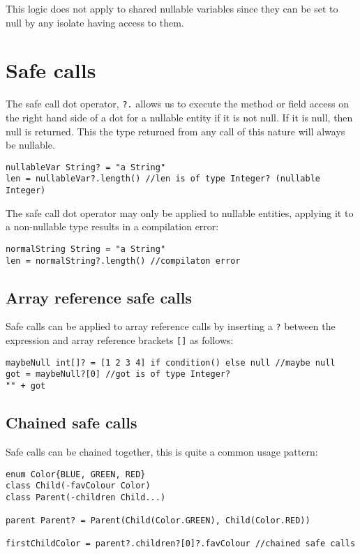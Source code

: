 \documentclass[conc-doc]{subfiles}
\begin{document}
This logic does not apply to shared nullable variables since they can be set to null by any isolate having access to them.


\section{Safe calls}
The safe call dot operator, \lstinline{?.} allows us to execute the method or field access on the right hand side of a dot for a nullable entity if it is not null. If it is null, then null is returned. This the type returned from any call of this nature will always be nullable.

\begin{lstlisting}
nullableVar String? = "a String"
len = nullableVar?.length() //len is of type Integer? (nullable Integer)
\end{lstlisting}

The safe call dot operator may only be applied to nullable entities, applying it to a non-nullable type results in a compilation error:

\begin{lstlisting}
normalString String = "a String"
len = normalString?.length() //compilaton error
\end{lstlisting}

\subsection{Array reference safe calls }
Safe calls can be applied to array reference calls by inserting a \lstinline{?} between the expression and array reference brackets \lstinline{[]} as follows:

\begin{lstlisting}
maybeNull int[]? = [1 2 3 4] if condition() else null //maybe null
got = maybeNull?[0] //got is of type Integer?
"" + got
\end{lstlisting}


\subsection{Chained safe calls}
Safe calls can be chained together, this is quite a common usage pattern:

\begin{lstlisting}
enum Color{BLUE, GREEN, RED}
class Child(-favColour Color)
class Parent(-children Child...)

parent Parent? = Parent(Child(Color.GREEN), Child(Color.RED))

firstChildColor = parent?.children?[0]?.favColour //chained safe calls
\end{lstlisting}
\end{document}

